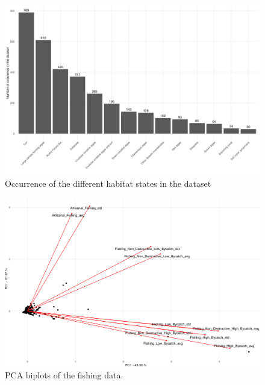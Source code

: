 \begin{figure}
\hypertarget{fig:chap3figS1}{%
\centering
\includegraphics{03-Chapitre3/figures/supplementary/06-occurence_habitat_dataset.png}
\caption{Occurrence of the different habitat states in the
dataset}\label{fig:chap3figS1}
}
\end{figure}

\begin{figure}
\hypertarget{fig:chap3figS2}{%
\centering
\includegraphics{03-Chapitre3/figures/supplementary/05-pca_fishing.png}
\caption{PCA biplots of the fishing data.}\label{fig:chap3figS2}
}
\end{figure}

